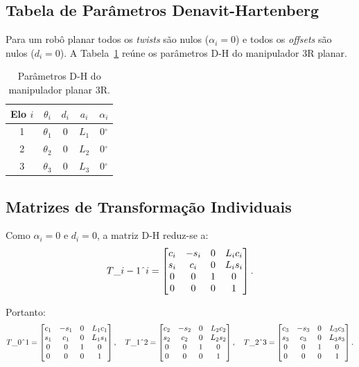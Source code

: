 \documentclass[12pt,a4paper]{article}
\def\Trans#1#2{T\string_#1\string^#2}%
\newcommand{\Trans}[2]{{}^{#1}_{#2}\!\mathbf{T}}
\newcommand{\degr}{\ensuremath{^{\circ}}}
\begin{document}
\subsection{Tabela de Par\^ametros Denavit-Hartenberg}

Para um rob\^o planar todos os \textit{twists} s\~ao nulos ($\alpha_i = 0$) e
todos os \textit{offsets} s\~ao nulos ($d_i = 0$).
A Tabela~\ref{tab:dh_planar} re\'une os par\^ametros D-H do manipulador 3R planar.

\begin{table}[h!]
  \centering
  \caption{Par\^ametros D-H do manipulador planar 3R.}
  \label{tab:dh_planar}
  \renewcommand{\arraystretch}{1.3}
  \begin{tabular}{ccccc}
    \toprule
    Elo $i$ & $\theta_i$ & $d_i$ & $a_i$ & $\alpha_i$ \\
    \midrule
    1 & $\theta_1$ & $0$ & $L_1$ & $0\degr$ \\
    2 & $\theta_2$ & $0$ & $L_2$ & $0\degr$ \\
    3 & $\theta_3$ & $0$ & $L_3$ & $0\degr$ \\
    \bottomrule
  \end{tabular}
\end{table}

\subsection{Matrizes de Transforma\c{c}\~ao Individuais}

Como $\alpha_i = 0$ e $d_i = 0$, a matriz D-H reduz-se a:
\[
  \Trans{i-1}{i} =
  \begin{bmatrix}
    c_i & -s_i & 0 & L_i c_i \\
    s_i &  c_i & 0 & L_i s_i \\
    0   &  0   & 1 & 0       \\
    0   &  0   & 0 & 1
  \end{bmatrix}.
\]

Portanto:
\[
  \Trans{0}{1} =
  \begin{bmatrix}
    c_1 & -s_1 & 0 & L_1 c_1 \\
    s_1 &  c_1 & 0 & L_1 s_1 \\
    0   &  0   & 1 & 0       \\
    0   &  0   & 0 & 1
  \end{bmatrix}, \quad
  \Trans{1}{2} =
  \begin{bmatrix}
    c_2 & -s_2 & 0 & L_2 c_2 \\
    s_2 &  c_2 & 0 & L_2 s_2 \\
    0   &  0   & 1 & 0       \\
    0   &  0   & 0 & 1
  \end{bmatrix}, \quad
  \Trans{2}{3} =
  \begin{bmatrix}
    c_3 & -s_3 & 0 & L_3 c_3 \\
    s_3 &  c_3 & 0 & L_3 s_3 \\
    0   &  0   & 1 & 0       \\
    0   &  0   & 0 & 1
  \end{bmatrix}.
\]
\end{document}
